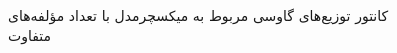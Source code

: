 \documentclass[12pt,onecolumn,a4paper]{article}
\begin{document}
\begin{figure}[h]
    \centering
    \caption{کانتور توزیع‌های گاوسی مربوط به میکسچرمدل با تعداد مؤلفه‌های متفاوت}
    \label{fig:6}
\end{figure}
\end{document}

